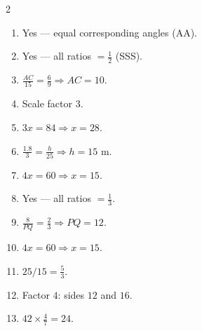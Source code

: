 \documentclass[11pt]{article}
\begin{document}
\begin{keybox}
\begin{multicols}{2}
\small
\begin{enumerate}[leftmargin=*,itemsep=3pt]
  \item Yes --- equal corresponding angles (AA).
  \item Yes --- all ratios $=\tfrac12$ (SSS).
  \item $\tfrac{AC}{15}=\tfrac{6}{9}\Rightarrow AC=10$.
  \item Scale factor $3$.
  \item $3x=84\Rightarrow x=28$.
  \item $\tfrac{1.8}{3}=\tfrac{h}{25}\Rightarrow h=15$ m.
  \item $4x=60\Rightarrow x=15$.
  \item Yes --- all ratios $=\tfrac13$.
  \item $\tfrac{8}{PQ}=\tfrac23\Rightarrow PQ=12$.
  \item $4x=60\Rightarrow x=15$.
  \item $25/15=\tfrac53$.
  \item Factor $4$: sides $12$ and $16$.
  \item $42\times\tfrac47=24$.
\end{enumerate}
\end{multicols}
\end{keybox}
\end{document}

